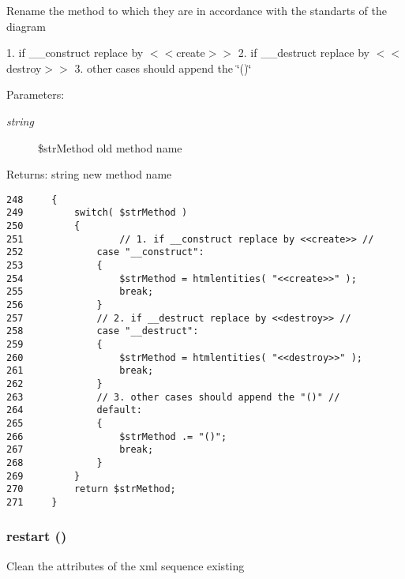 Rename the method to which they are in accordance with the standarts of the diagram

1. if \_\-\_\-construct replace by $<$$<$create$>$$>$ 2. if \_\-\_\-destruct replace by $<$$<$destroy$>$$>$ 3. other cases should append the \char`\"{}()\char`\"{}

\begin{Desc}
\item[Parameters:]
\begin{description}
\item[{\em string}]\$strMethod old method name \end{description}
\end{Desc}
\begin{Desc}
\item[Returns:]string new method name \end{Desc}


\begin{Code}\begin{verbatim}248     {
249         switch( $strMethod )
250         {
251                 // 1. if __construct replace by <<create>> //
252             case "__construct":
253             {
254                 $strMethod = htmlentities( "<<create>>" );
255                 break;
256             }
257             // 2. if __destruct replace by <<destroy>> //
258             case "__destruct":
259             {
260                 $strMethod = htmlentities( "<<destroy>>" );
261                 break;
262             }
263             // 3. other cases should append the "()" //
264             default:
265             {
266                 $strMethod .= "()";
267                 break;
268             }
269         }
270         return $strMethod;
271     }
\end{verbatim}
\end{Code}


\hypertarget{class_code_instrumentation_receiver_c8de9e38ce27c87f710dff42a13455cf}{
\subsubsection[{restart}]{\setlength{\rightskip}{0pt plus 5cm}restart ()}}
\label{class_code_instrumentation_receiver_c8de9e38ce27c87f710dff42a13455cf}


Clean the attributes of the xml sequence existing

